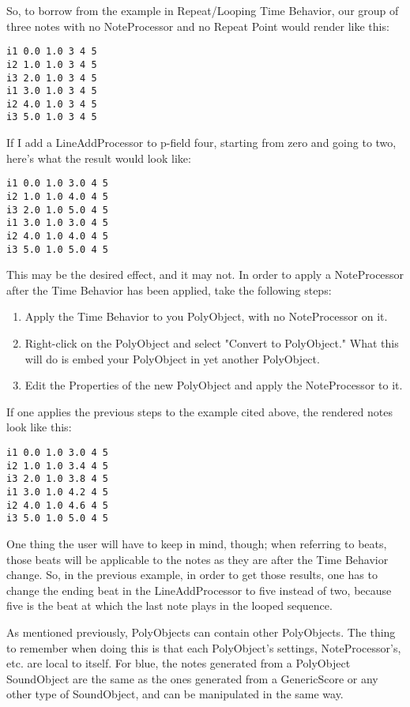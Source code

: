 So, to borrow from the example in Repeat/Looping Time Behavior, our
group of three notes with no NoteProcessor and no Repeat Point would
render like this:

\begin{verbatim}
i1 0.0 1.0 3 4 5
i2 1.0 1.0 3 4 5
i3 2.0 1.0 3 4 5
i1 3.0 1.0 3 4 5
i2 4.0 1.0 3 4 5
i3 5.0 1.0 3 4 5
\end{verbatim}

If I add a LineAddProcessor to p-field four, starting from zero and
going to two, here's what the result would look like:

\begin{verbatim}
i1 0.0 1.0 3.0 4 5
i2 1.0 1.0 4.0 4 5
i3 2.0 1.0 5.0 4 5
i1 3.0 1.0 3.0 4 5
i2 4.0 1.0 4.0 4 5
i3 5.0 1.0 5.0 4 5
\end{verbatim}

This may be the desired effect, and it may not. In order to apply a
NoteProcessor after the Time Behavior has been applied, take the
following steps:

\begin{enumerate}
\def\labelenumi{\arabic{enumi}.}
\item
  Apply the Time Behavior to you PolyObject, with no NoteProcessor on
  it.
\item
  Right-click on the PolyObject and select "Convert to PolyObject." What
  this will do is embed your PolyObject in yet another PolyObject.
\item
  Edit the Properties of the new PolyObject and apply the NoteProcessor
  to it.
\end{enumerate}

If one applies the previous steps to the example cited above, the
rendered notes look like this:

\begin{verbatim}
i1 0.0 1.0 3.0 4 5
i2 1.0 1.0 3.4 4 5
i3 2.0 1.0 3.8 4 5
i1 3.0 1.0 4.2 4 5
i2 4.0 1.0 4.6 4 5
i3 5.0 1.0 5.0 4 5
\end{verbatim}

One thing the user will have to keep in mind, though; when referring to
beats, those beats will be applicable to the notes as they are after the
Time Behavior change. So, in the previous example, in order to get those
results, one has to change the ending beat in the LineAddProcessor to
five instead of two, because five is the beat at which the last note
plays in the looped sequence.

As mentioned previously, PolyObjects can contain other PolyObjects. The
thing to remember when doing this is that each PolyObject's settings,
NoteProcessor's, etc. are local to itself. For blue, the notes generated
from a PolyObject SoundObject are the same as the ones generated from a
GenericScore or any other type of SoundObject, and can be manipulated in
the same way.

